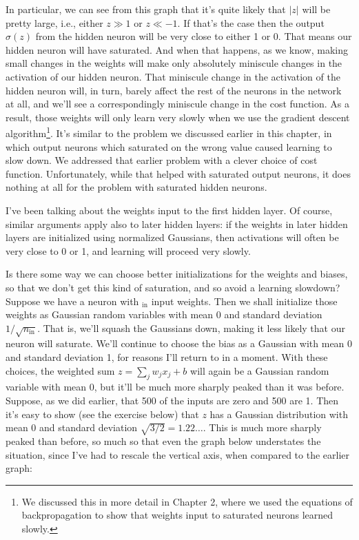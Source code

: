 \documentclass[a4paper,twoside,10pt]{book}
\begin{document}
In particular, we can see from this graph that it's quite likely that $|z|$ will be pretty large, i.e., either $z\gg1$ or $z\ll−1$. If that's the case then the output $\sigma(z)$ from the hidden neuron will be very close to either 1 or 0. That means our hidden neuron will have saturated. And when that happens, as we know, making small changes in the weights will make only absolutely miniscule changes in the activation of our hidden neuron. That miniscule change in the activation of the hidden neuron will, in turn, barely affect the rest of the neurons in the network at all, and we'll see a correspondingly miniscule change in the cost function. As a result, those weights will only learn very slowly when we use the gradient descent algorithm\footnote{We discussed this in more detail in Chapter 2, where we used the equations of backpropagation to show that weights input to saturated neurons learned slowly.}. It's similar to the problem we discussed earlier in this chapter, in which output neurons which saturated on the wrong value caused learning to slow down. We addressed that earlier problem with a clever choice of cost function. Unfortunately, while that helped with saturated output neurons, it does nothing at all for the problem with saturated hidden neurons.

I've been talking about the weights input to the first hidden layer. Of course, similar arguments apply also to later hidden layers: if the weights in later hidden layers are initialized using normalized Gaussians, then activations will often be very close to 0 or 1, and learning will proceed very slowly.

Is there some way we can choose better initializations for the weights and biases, so that we don't get this kind of saturation, and so avoid a learning slowdown? Suppose we have a neuron with $_\mathrm{in}$ input weights. Then we shall initialize those weights as Gaussian random variables with mean 0 and standard deviation $1/\sqrt{n_\mathrm{in}}$. That is, we'll squash the Gaussians down, making it less likely that our neuron will saturate. We'll continue to choose the bias as a Gaussian with mean 0 and standard deviation 1, for reasons I'll return to in a moment. With these choices, the weighted sum $z=\sum_jw_jx_j+b$ will again be a Gaussian random variable with mean 0, but it'll be much more sharply peaked than it was before. Suppose, as we did earlier, that 500 of the inputs are zero and 500 are 1. Then it's easy to show (see the exercise below) that $z$ has a Gaussian distribution with mean 0 and standard deviation $\sqrt{3/2}=1.22\ldots$. This is much more sharply peaked than before, so much so that even the graph below understates the situation, since I've had to rescale the vertical axis, when compared to the earlier graph:
\end{document}
